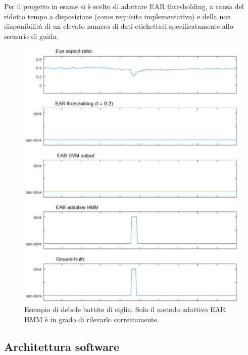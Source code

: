 \documentclass[12pt]{article}
\begin{document}
Per il progetto in esame si è scelto di adottare EAR thresholding, a causa del ridotto tempo a disposizione (come requisito implementativo) e della non disponibilità di un elevato numero di dati etichettati specificatamente allo scenario di guida.
\begin{figure}[!htb]
	\centering
	\includegraphics[scale=0.60]{eps/ear_methods.eps}
	\caption{Esempio di debole battito di ciglia. Solo il metodo adattivo EAR HMM è in grado di rilevarlo correttamente.}
	\label{fig:ear_methods}
\end{figure}

\subsection{Architettura software}
\label{subsec:software}
\end{document}
